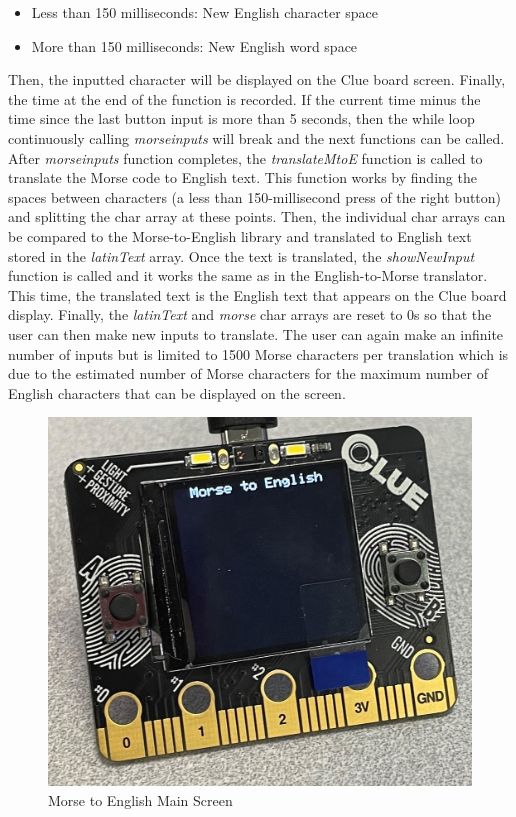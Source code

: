 \documentclass[12pt]{article}
\begin{document}
\begin{itemize}
    \item Less than 150 milliseconds: New English character space
    \item More than 150 milliseconds: New English word space
\end{itemize}
Then, the inputted character will be displayed on the Clue board screen. Finally, the time at the end of the function is recorded. If the current time minus the time since the last button input is more than 5 seconds, then the while loop continuously calling \emph{morseinputs} will break and the next functions can be called. After \emph{morseinputs} function completes, the \emph{translateMtoE} function is called to translate the Morse code to English text. This function works by finding the spaces between characters (a less than 150-millisecond press of the right button) and splitting the char array at these points. Then, the individual char arrays can be compared to the Morse-to-English library and translated to English text stored in the \emph{latinText} array. Once the text is translated, the \emph{showNewInput} function is called and it works the same as in the English-to-Morse translator. This time, the translated text is the English text that appears on the Clue board display. Finally, the \emph{latinText} and \emph{morse} char arrays are reset to 0s so that the user can then make new inputs to translate. The user can again make an infinite number of inputs but is limited to 1500 Morse characters per translation which is due to the estimated number of Morse characters for the maximum number of English characters that can be displayed on the screen.

\begin{figure}[!ht]
\centering
\includegraphics[width=4 in]{images/MtoE.jpg}
\caption{Morse to English Main Screen}
\label{MtoE}
\end{figure}
\end{document}
